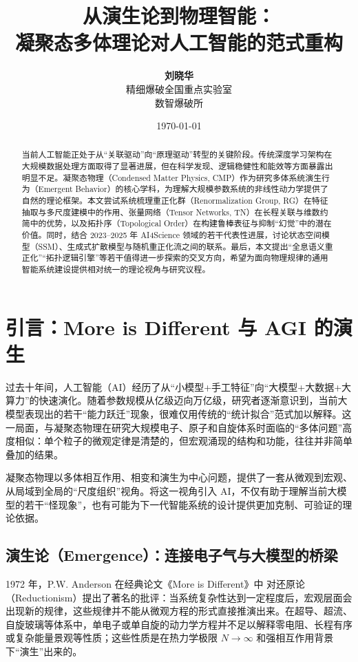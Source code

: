 \documentclass[12pt,a4paper]{article}
\title{\Huge \textbf{从演生论到物理智能：\\凝聚态多体理论对人工智能的范式重构}}
\author{\Large \textbf{刘晓华} \\[0.5em]
\small 精细爆破全国重点实验室 \\ 
\small 数智爆破所}
\date{\today}
\begin{document}
\maketitle

\begin{abstract}
当前人工智能正处于从“关联驱动”向“原理驱动”转型的关键阶段。传统深度学习架构在大规模数据处理方面取得了显著进展，但在科学发现、逻辑稳健性和能效等方面暴露出明显不足。凝聚态物理（Condensed Matter Physics, CMP）作为研究多体系统演生行为（Emergent Behavior）的核心学科，为理解大规模参数系统的非线性动力学提供了自然的理论框架。本文尝试系统梳理重正化群（Renormalization Group, RG）在特征抽取与多尺度建模中的作用、张量网络（Tensor Networks, TN）在长程关联与维数约简中的优势，以及拓扑序（Topological Order）在构建鲁棒表征与抑制“幻觉”中的潜在价值。同时，结合 2023–2025 年 AI4Science 领域的若干代表性进展，讨论状态空间模型（SSM）、生成式扩散模型与随机重正化流之间的联系。最后，本文提出“全息语义重正化”“拓扑逻辑引擎”等若干值得进一步探索的交叉方向，希望为面向物理规律的通用智能系统建设提供相对统一的理论视角与研究议程。
\end{abstract}

\newpage
\renewcommand{\contentsname}{目 录}
\tableofcontents
\newpage

\section{引言：More is Different 与 AGI 的演生}

过去十年间，人工智能（AI）经历了从“小模型+手工特征”向“大模型+大数据+大算力”的快速演化。随着参数规模从亿级迈向万亿级，研究者逐渐意识到，当前大模型表现出的若干“能力跃迁”现象，很难仅用传统的“统计拟合”范式加以解释。这一局面，与凝聚态物理在研究大规模电子、原子和自旋体系时面临的“多体问题”高度相似：单个粒子的微观定律是清楚的，但宏观涌现的结构和功能，往往并非简单叠加的结果。

凝聚态物理以多体相互作用、相变和演生为中心问题，提供了一套从微观到宏观、从局域到全局的“尺度组织”视角。将这一视角引入 AI，不仅有助于理解当前大模型的若干“怪现象”，也有可能为下一代智能系统的设计提供更加克制、可验证的理论依据。

\subsection{演生论（Emergence）：连接电子气与大模型的桥梁}

1972 年，P.W. Anderson 在经典论文《More is Different》中\cite{anderson1972more} 对还原论（Reductionism）提出了著名的批评：当系统复杂性达到一定程度后，宏观层面会出现新的规律，这些规律并不能从微观方程的形式直接推演出来。在超导、超流、自旋玻璃等体系中，单电子或单自旋的动力学方程并不足以解释零电阻、长程有序或复杂能量景观等性质；这些性质是在热力学极限 $N \to \infty$ 和强相互作用背景下“演生”出来的。
\end{document}
